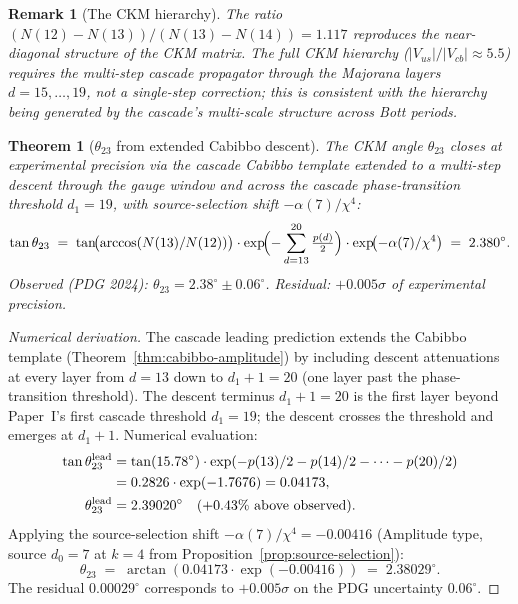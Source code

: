 \documentclass[12pt,a4paper]{article}
\newtheorem{theorem}{Theorem}[section]
\newtheorem*{remark}{Remark}
\begin{document}
\begin{remark}[The CKM hierarchy]\label{rem:ckm-hierarchy}
The ratio $(N(12) - N(13))/(N(13) - N(14)) = 1.117$ reproduces the near-diagonal structure of the CKM matrix. The full CKM hierarchy ($|V_{us}|/|V_{cb}| \approx 5.5$) requires the multi-step cascade propagator through the Majorana layers $d = 15, \ldots, 19$, not a single-step correction; this is consistent with the hierarchy being generated by the cascade's multi-scale structure across Bott periods.
\end{remark}

\begin{theorem}[$\theta_{23}$ from extended Cabibbo descent]\label{thm:theta23-closure}
The CKM angle $\theta_{23}$ closes at experimental precision via the cascade Cabibbo template extended to a multi-step descent through the gauge window and across the cascade phase-transition threshold $d_1=19$, with source-selection shift $-\alpha(7)/\chi^4$:
\[
\tan\theta_{23} \;=\; \tan\!\bigl(\arccos(N(13)/N(12))\bigr)\cdot\exp\!\Bigl(-\sum_{d=13}^{20}\tfrac{p(d)}{2}\Bigr)\cdot\exp\!\bigl(-\alpha(7)/\chi^4\bigr) \;=\; 2.380^\circ.
\]
Observed (PDG 2024): $\theta_{23} = 2.38^\circ \pm 0.06^\circ$. Residual: $+0.005\sigma$ of experimental precision.
\end{theorem}

\begin{proof}[Numerical derivation]
The cascade leading prediction extends the Cabibbo template (Theorem~\ref{thm:cabibbo-amplitude}) by including descent attenuations at every layer from $d=13$ down to $d_1+1=20$ (one layer past the phase-transition threshold). The descent terminus $d_1+1=20$ is the first layer beyond Paper~I's first cascade threshold $d_1=19$; the descent crosses the threshold and emerges at $d_1+1$. Numerical evaluation:
\begin{align*}
\tan\theta_{23}^{\rm lead} &= \tan(15.78^\circ)\cdot\exp(-p(13)/2-p(14)/2-\cdots-p(20)/2) \\
&= 0.2826\cdot\exp(-1.7676) = 0.04173, \\
\theta_{23}^{\rm lead} &= 2.39020^\circ \quad (\text{+0.43\% above observed}).
\end{align*}
Applying the source-selection shift $-\alpha(7)/\chi^4 = -0.00416$ (Amplitude type, source $d_0=7$ at $k=4$ from Proposition~\ref{prop:source-selection}):
\[
\theta_{23} \;=\; \arctan(0.04173\cdot\exp(-0.00416)) \;=\; 2.38029^\circ.
\]
The residual $0.00029^\circ$ corresponds to $+0.005\sigma$ on the PDG uncertainty $0.06^\circ$.
\end{proof}
\end{document}
